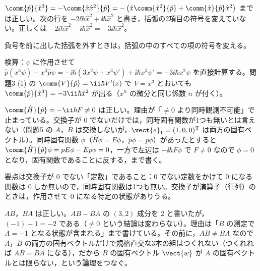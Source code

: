 \begin{kotaeran}
   $\comm{\hat{p}}{\hat{x}^{3}}=-\comm{\hat{x}\hat{x}^{2}}{\hat{p}}=-\left(\hat{x}\comm{\hat{x}^{2}}{\hat{p}}+\comm{\hat{x}}{\hat{p}}\hat{x}^{2}\right)$ までは正しい。次の行を $-2\ii\hbar\hat{x}^{2}+\ii\hbar\hat{x}^{2}$ と書き，括弧の2項目の符号を変えていない。正しくは $-2\ii\hbar\hat{x}^{2}-\ii\hbar\hat{x}^{2}=-3\ii\hbar\hat{x}^{2}$。
\end{kotaeran}
\begin{rikai}
  \item 負号を前に出した括弧を外すときは，括弧の中のすべての項の符号を変える。
  \item 検算：$\psi$ に作用させて $\hat{p}(x^{3}\psi)-x^{3}\hat{p}\psi=-\ii\hbar(3x^{2}\psi+x^{3}\psi')+\ii\hbar x^{3}\psi'=-3\ii\hbar x^{2}\psi$ を直接計算する。問題3 (1) の $\comm{V}{\hat{p}}=\ii\hbar V'(x)$ で $V=x^{3}$ とおいても $\comm{\hat{p}}{\hat{x}^{3}}=-3\ii\hbar\hat{x}^{2}$ が出る（$x^{n}$ の微分と同じ係数 $n$ が付く）。
\end{rikai}
\begin{kotaeran}
   $\comm{\hat{H}}{\hat{p}}=-\ii\hbar F\ne 0$ は正しい。理由が「$\ne 0$ より同時観測不可能」で止まっている。交換子が $0$ でないだけでは，同時固有関数が1つも無いとは言えない（問題5 の $A$，$B$ は交換しないが，$\vect{e}_{1}=(1,0,0)^{\mathrm{T}}$ は両方の固有ベクトル）。同時固有関数 $\phi$（$\hat{H}\phi=E\phi$，$\hat{p}\phi=p\phi$）があったとすると $\comm{\hat{H}}{\hat{p}}\phi=pE\phi-Ep\phi=0$，一方で左辺は $-\ii\hbar F\phi$ で $F\ne 0$ なので $\phi=0$ となり，固有関数であることに反する，まで書く。
\end{kotaeran}
\begin{rikai}
  \item 要点は交換子が $0$ でない「定数」であること：$0$ でない定数をかけて $0$ になる関数は $0$ しか無いので，同時固有関数は1つも無い。交換子が演算子（行列）のときは，作用させて $0$ になる特定の状態がありうる。
\end{rikai}
\begin{kotaeran}
   $AB$，$BA$ は正しい。$AB-BA$ の $(3,2)$ 成分を $2$ と書いたが，$(-1)-1=-2$ である（$\ne 0$ という結論は変わらない）。理由は「$B$ の測定で $A=-1$ となる状態が含まれる」まで書けている。その前に，$AB\ne BA$ なので $A$，$B$ の両方の固有ベクトルだけで規格直交な3本の組はつくれない（つくれれば $AB=BA$ になる），だから $B$ の固有ベクトル $\vect{w}$ が $A$ の固有ベクトルとは限らない，という論理をつなぐ。
\end{kotaeran}
